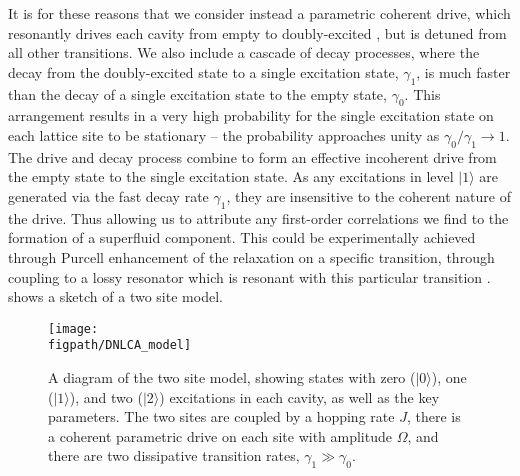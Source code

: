 It is for these reasons that we consider instead a parametric coherent drive, which resonantly drives each cavity from empty to doubly-excited \cite{Ma2017,Savona2017}, but is detuned from all other transitions. We also include a cascade of decay processes, where the decay from the doubly-excited state to a single excitation state, \(\gamma_{1}\), is much faster than the decay of a single excitation state to the empty state, \(\gamma_{0}\). This arrangement results in a very high probability for the single excitation state on each lattice site to be stationary -- the probability approaches unity as \(\gamma_{0}/\gamma_{1} \rightarrow 1\). The drive and decay process combine to form an effective incoherent drive from the empty state to the single excitation state. As any excitations in level \(|1\rangle\) are generated via the fast decay rate \(\gamma_{1}\), they are insensitive to the coherent nature of the drive. Thus allowing us to attribute any first-order correlations we find to the formation of a superfluid component. This could be experimentally achieved through Purcell enhancement \cite{Purcell1946,Fox_Purcell} of the relaxation on a specific transition, through coupling to a lossy resonator which is resonant with this particular transition \cite{Bienfait2016}.  shows a sketch of a two site model.

\begin{figure}[ht!]
\centering 
\texttt{[image: \\figpath/DNLCA\_model]}
\caption{\label{fig:dnlca1-1}A diagram of the two site model, showing states with zero (\(|0\rangle\)), one (\(|1\rangle\)), and two (\(|2\rangle\)) excitations in each cavity, as well as the key parameters. The two sites are coupled by a hopping rate \(J\), there is a coherent parametric drive on each site with amplitude \(\Omega\), and there are two dissipative transition rates, \(\gamma_{1} \gg \gamma_{0}\).}
\end{figure}

